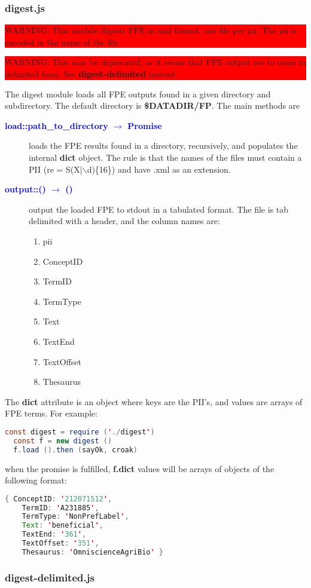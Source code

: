 \documentclass[a4paper,11pt]{report}
\newcommand{\cs}[1]{{\bfseries \ttfamily #1}}
\newcommand{\datadir}[1]{\cs{\$DATADIR/#1}}
\newcommand{\arrow}[2]{#1 $\rightarrow$ #2}
\newcommand{\fsig}[3]{\textcolor{blue}{\cs{#1::\arrow{#2}{#3}}}}
\newcommand{\sigit}[3]{\item[\fsig{#1}{#2}{#3}]}
\newcommand{\WARNING}[1]{\begin{center}\bfseries \colorbox{red}{\parbox{0.9\textwidth}{WARNING: #1}}\end{center}}
\begin{document}
\subsubsection{digest.js}
\WARNING{This module digests FPE in xml format, one file per pii. The pii is encoded in the name of the file}
\WARNING{This may be deprecated, as it seems that FPE output are to come in delimited form. See \cs{digest-delimited} instead}
The digest module loads all FPE outputs found in a given directory and subdirectory.
The default directory is \datadir{FP}. The main methods are
%
\begin{description}
\sigit{load}{path\_to\_directory}{Promise} loads the FPE results found in a directory, recursively, and populates the internal \cs{dict} object. The rule is that the names of the files must contain a PII (re = S(X|$\backslash$d)\{16\}) and have .xml as an extension.
\sigit{output}{()}{()} output the loaded FPE to stdout in a tabulated format. The file is tab delimited with a header, and the column names are:
  \begin{enumerate}
  \item pii
  \item ConceptID
  \item TermID
  \item TermType
  \item Text
  \item TextEnd
  \item TextOffset
  \item Thesaurus
  \end{enumerate}
\end{description}
%
The \cs{dict} attribute is an object where keys are the PII's, and values are arrays of FPE terms. For example:
\begin{lstlisting}[language=java]
  const digest = require ('./digest')
  const f = new digest ()
  f.load ().then (sayOk, croak)
\end{lstlisting}
when the promise is fulfilled, \cs{f.dict} values will be arrays of objects of the following format:
\begin{lstlisting}[language=java]
   { ConceptID: '212071512',
    TermID: 'A231885',
    TermType: 'NonPrefLabel',
    Text: 'beneficial',
    TextEnd: '361',
    TextOffset: '351',
    Thesaurus: 'OmniscienceAgriBio' }
\end{lstlisting}
\subsubsection{digest-delimited.js}
\end{document}
